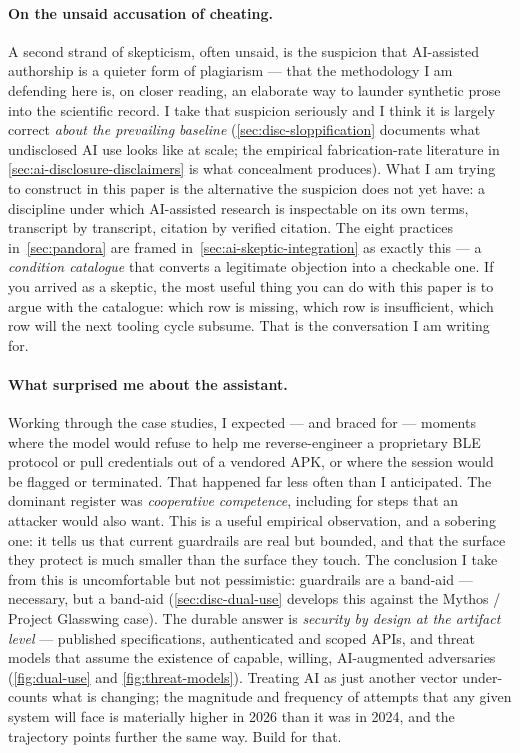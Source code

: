 \documentclass[11pt,a4paper]{article}
\begin{document}
\paragraph{On the unsaid accusation of cheating.}
A second strand of skepticism, often unsaid, is the suspicion that
AI-assisted authorship is a quieter form of plagiarism --- that the
methodology I am defending here is, on closer reading, an elaborate way
to launder synthetic prose into the scientific record. I take that
suspicion seriously and I think it is largely correct \emph{about the
prevailing baseline} (\cref{sec:disc-sloppification} documents what
undisclosed AI use looks like at scale; the empirical fabrication-rate
literature in \cref{sec:ai-disclosure-disclaimers} is what concealment
produces). What I am trying to construct in this paper is the
alternative the suspicion does not yet have: a discipline under which
AI-assisted research is inspectable on its own terms, transcript by
transcript, citation by verified citation. The eight practices
in~\cref{sec:pandora} are framed
in~\cref{sec:ai-skeptic-integration} as exactly this --- a
\emph{condition catalogue} that converts a legitimate objection into a
checkable one. If you arrived as a skeptic, the most useful thing you
can do with this paper is to argue with the catalogue: which row is
missing, which row is insufficient, which row will the next tooling
cycle subsume. That is the conversation I am writing for.

\paragraph{What surprised me about the assistant.}
Working through the case studies, I expected --- and braced for ---
moments where the model would refuse to help me reverse-engineer a
proprietary BLE protocol or pull credentials out of a vendored APK,
or where the session would be flagged or terminated. That happened
far less often than I anticipated. The dominant register was
\emph{cooperative competence}, including for steps that an attacker
would also want. This is a useful empirical observation, and a
sobering one: it tells us that current guardrails are real but
bounded, and that the surface they protect is much smaller than the
surface they touch. The conclusion I take from this is uncomfortable
but not pessimistic: guardrails are a band-aid --- necessary, but a
band-aid (\cref{sec:disc-dual-use} develops this against the Mythos /
Project Glasswing case). The durable answer is \emph{security by
design at the artifact level} --- published specifications,
authenticated and scoped APIs, and threat models that assume the
existence of capable, willing, AI-augmented adversaries
(\cref{fig:dual-use} and \cref{fig:threat-models}). Treating AI as
just another vector under-counts what is changing; the magnitude and
frequency of attempts that any given system will face is materially
higher in 2026 than it was in 2024, and the trajectory points further
the same way. Build for that.
\end{document}

